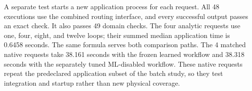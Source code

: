 A separate test starts a new application process for each request. All 48 executions use the combined routing interface, and every successful output passes an exact check. It also passes 49 domain checks. The four analytic requests use one, four, eight, and twelve loops; their summed median application time is 0.6458 seconds. The same formula serves both comparison paths. The 4 matched native requests take 38.161 seconds with the frozen learned workflow and 38.318 seconds with the separately tuned ML-disabled workflow. These native requests repeat the predeclared application subset of the batch study, so they test integration and startup rather than new physical coverage.
